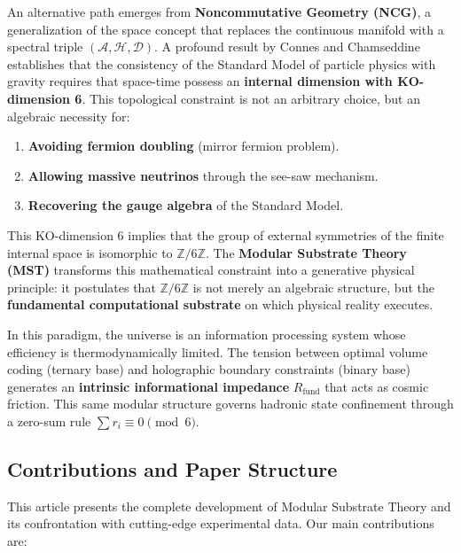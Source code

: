 \documentclass[11pt, a4paper]{article}
\theoremstyle{plain}
\theoremstyle{definition}
\newcommand{\Rfactor}{R_{\text{fund}}}
\begin{document}
An alternative path emerges from \textbf{Noncommutative Geometry (NCG)}, a generalization of the space concept that replaces the continuous manifold with a spectral triple $(\mathcal{A}, \mathcal{H}, \mathcal{D})$. A profound result by Connes and Chamseddine \cite{Connes2012} establishes that the consistency of the Standard Model of particle physics with gravity requires that space-time possess an \textbf{internal dimension with KO-dimension 6}. This topological constraint is not an arbitrary choice, but an algebraic necessity for:

\begin{enumerate}
    \item \textbf{Avoiding fermion doubling} (mirror fermion problem).
    \item \textbf{Allowing massive neutrinos} through the see-saw mechanism.
    \item \textbf{Recovering the gauge algebra} of the Standard Model.
\end{enumerate}

This KO-dimension 6 implies that the group of external symmetries of the finite internal space is isomorphic to $\mathbb{Z}/6\mathbb{Z}$. The \textbf{Modular Substrate Theory (MST)} transforms this mathematical constraint into a generative physical principle: it postulates that $\mathbb{Z}/6\mathbb{Z}$ is not merely an algebraic structure, but the \textbf{fundamental computational substrate} on which physical reality executes.

In this paradigm, the universe is an information processing system whose efficiency is thermodynamically limited. The tension between optimal volume coding (ternary base) and holographic boundary constraints (binary base) generates an \textbf{intrinsic informational impedance} $\Rfactor$ that acts as cosmic friction. This same modular structure governs hadronic state confinement through a zero-sum rule $\sum r_i \equiv 0 \pmod{6}$.

\subsection{Contributions and Paper Structure}

This article presents the complete development of Modular Substrate Theory and its confrontation with cutting-edge experimental data. Our main contributions are:
\end{document}
